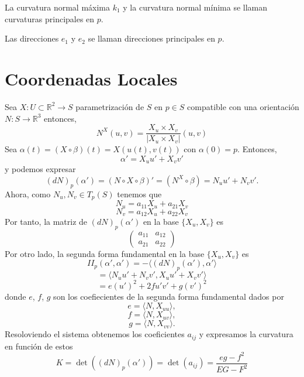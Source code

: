 \begin{defn}
  La curvatura normal máxima $k_{1}$ y la curvatura normal mínima se llaman curvaturas principales en $p$.
\end{defn}

\begin{defn}
   Las direcciones $e_{1}$ y $e_{2}$ se llaman direcciones principales en $p$.
\end{defn}

\section{Coordenadas Locales}

\begin{note}
  Sea $X : U \subset \mathbb{R}^{2} \to S$ parametrización de $S$ en $p \in S$ compatible con una orientación $N : S \to \mathbb{R}^{3}$ entonces,
  \[ 
    N^{X}(u,v) = \frac{X_{u} \times X_{v}}{| X_{u} \times X_{v} |}(u,v)
  \] 
  Sea $\alpha(t) = (X \circ \beta)(t) = X(u(t),v(t))$ con $\alpha(0) = p$. Entonces,
  \[ 
    \alpha' = X_{u} u' + X_{v} v' 
  \] 
  y podemos expresar
  \[ 
    (d N)_{p}(\alpha') = (N \circ X \circ \beta)' = (N^{X} \circ \beta)= N_{u} u' + N_{v} v' .
  \] 
  Ahora, como $N_{u}, N_{v} \in T_{p}(S)$ tenemos que
  \[ 
    N_{u} = a_{11} X_{u} + a_{21} X_{v} 
  \] 
  \[ 
    N_{v} = a_{12} X_{u} + a_{22} X_{v} 
  \] 
  Por tanto, la matriz de $(d N)_{p}(\alpha')$ en la base $\{ X_{u}, X_{v} \}$ es
  \[ 
    \begin{pmatrix}
       a_{11} & a_{12} \\
       a_{21} & a_{22}
    \end{pmatrix}
  \] 
  Por otro lado, la segunda forma fundamental en la base $\{ X_{u}, X_{v} \}$ es 
  \[ 
    II_{p}(\alpha', \alpha') = - \langle (d N)_{p}(\alpha'){ , }\alpha' \rangle
  \] 
  \[ 
    = \langle N_{u}u' + N_{v} v'{ , }X_{u} u' + X_{v} v' \rangle 
  \] 
  \[ 
    = e(u')^{2} + 2 f u' v' + g(v')^{2} 
  \] 
  donde $e$, $f$, $g$ son los coefiecientes de la segunda forma fundamental dados por
  \[ 
    e = \langle N{ , }X_{uu} \rangle, 
  \] 
  \[ 
    f = \langle N{ , }X_{uv} \rangle,
  \] 
  \[ 
    g = \langle N{ , }X_{vv} \rangle.
  \] 
  Resoloviendo el sistema obtenemos los coeficientes $a_{ij}$ y expresamos la curvatura en función de estos
  \[ 
    K = \det((d N)_{p}(\alpha')) = \det(a_{ij}) = \frac{eg - f^{2}}{EG - F^{2}}
  \] 
\end{note}

